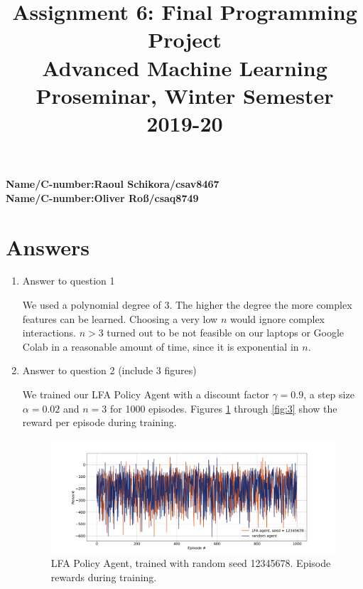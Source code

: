 \documentclass[11pt,a4paper]{article}
\title{\textbf{Assignment 6: Final Programming Project} \\ \Large Advanced Machine Learning Proseminar, Winter Semester 2019-20}
\date{}
\begin{document}
\maketitle

\vspace{-1cm}

\noindent
\textbf{Name/C-number:Raoul Schikora/csav8467}  \\
\textbf{Name/C-number:Oliver Roß/csaq8749}  \\

\section{Answers}

\begin{enumerate}
\item Answer to question 1
	
We used a polynomial degree of 3. The higher the degree the more complex features can be learned. Choosing a very low $n$ would ignore complex interactions. $n>3$ turned out to be not feasible on our laptops or Google Colab in a reasonable amount of time, since it is exponential in $n$.

\item Answer to question 2 (include 3 figures)

We trained our LFA Policy Agent with a discount factor $\gamma = 0.9$, a step size $\alpha = 0.02$ and $n = 3$ for 1000 episodes.
	Figures \ref{fig:1} through \ref{fig:3} show the reward per episode during training.
	\begin{figure}
	\begin{center}
		\includegraphics[width = 20cm]{12345678.png}
		\caption{LFA Policy Agent, trained with random seed 12345678. Episode rewards during training.}
		\label{fig:1}
	\end{center}
	\end{figure}


\end{enumerate}
\end{document}
